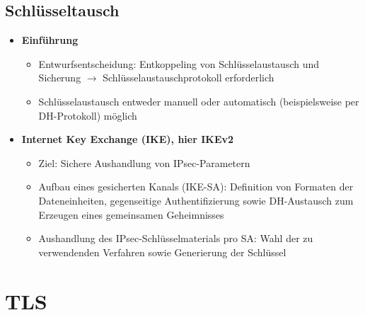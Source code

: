 \subsection{Schlüsseltausch}
\begin{itemize}
	\item \textbf{Einführung}
	\begin{itemize}
		\item Entwurfsentscheidung: Entkoppeling von Schlüsselaustausch und Sicherung \(\rightarrow\) Schlüsselaustauschprotokoll erforderlich
		\item Schlüsselaustausch entweder manuell oder automatisch (beispielsweise per DH-Protokoll) möglich
	\end{itemize}
	\item \textbf{Internet Key Exchange (IKE), hier IKEv2}
	\begin{itemize}
		\item Ziel: Sichere Aushandlung von IPsec-Parametern
		\item Aufbau eines gesicherten Kanals (IKE-SA): Definition von Formaten der Dateneinheiten, gegenseitige Authentifizierung sowie DH-Austausch zum Erzeugen eines gemeinsamen Geheimnisses
		\item Aushandlung des IPsec-Schlüsselmaterials pro SA: Wahl der zu verwendenden Verfahren sowie Generierung der Schlüssel
	\end{itemize}
\end{itemize}



\section{TLS}

